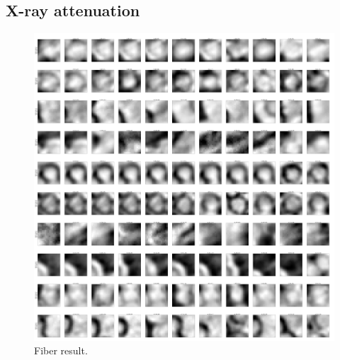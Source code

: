 \subsection{X-ray attenuation}\label{subsec:microct}

\cite{IEEEBigData:2014}


\begin{figure}[h]
\centering
\includegraphics[width=\linewidth]{img/fiberResult.png}
\caption{Fiber result.}
\label{fig:fiberResult}
\end{figure}
